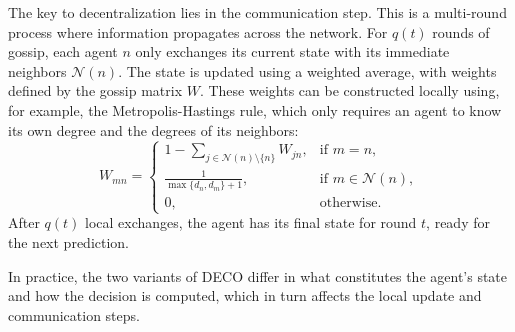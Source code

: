 \documentclass[journal]{IEEEtran} %
\newcommand{\algname}{{DECO}\xspace}
\begin{document}
The key to decentralization lies in the communication step.
This is a multi-round process where information propagates across the network.
For $q(t)$ rounds of gossip, each agent $n$ only exchanges its current state with its immediate neighbors $\mathcal{N}(n)$.
The state is updated using a weighted average, with weights defined by the gossip matrix $W$.
These weights can be constructed locally using, for example, the Metropolis-Hastings rule, which only requires an agent to know its own degree and the degrees of its neighbors:
\begin{equation}\label{eq:Metropolis-Hastings}
    W_{mn} = \begin{cases}
        1 - \sum_{j \in \mathcal{N}(n) \setminus \{n\}} W_{jn}, & \text{if } m = n,                \\
        \frac{1}{\max\{d_n, d_m\} + 1},                         & \text{if } m \in \mathcal{N}(n), \\
        0,                                                      & \text{otherwise}.
    \end{cases}
\end{equation}
After $q(t)$ local exchanges, the agent has its final state for round $t$, ready for the next prediction.

In practice, the two variants of \algname{} differ in what constitutes the agent's state and how the decision is computed, which in turn affects the local update and communication steps.
\end{document}
